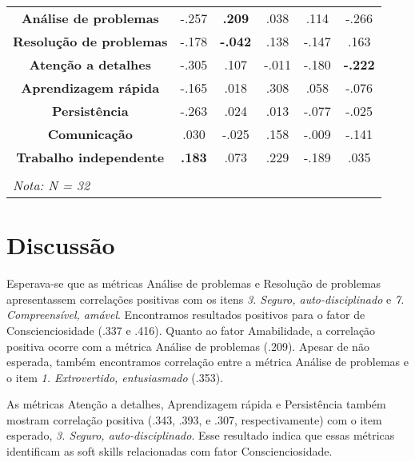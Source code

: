 \begin{sidewaystable}[ph!]
\begin{tabular}{lccccc}
		\midrule
    \multicolumn{1}{c}{\textbf{Análise de problemas}} 		& -.257 				 & \textbf{.209}  & .038  & .114  & -.266 				 \\
    \multicolumn{1}{c}{\textbf{Resolução de problemas}} 	& -.178 				 & \textbf{-.042} & .138  & -.147 & .163 				   \\
    \multicolumn{1}{c}{\textbf{Atenção a detalhes}} 			& -.305 				 & .107 				  & -.011 & -.180 & \textbf{-.222} \\
    \multicolumn{1}{c}{\textbf{Aprendizagem rápida}} 			& -.165 				 & .018 				  & .308  & .058  & -.076  				 \\
    \multicolumn{1}{c}{\textbf{Persistência}} 					  & -.263 				 & .024 				  & .013  & -.077 & -.025 				 \\
    \multicolumn{1}{c}{\textbf{Comunicação}} 							& .030 				   & -.025 				  & .158  & -.009 & -.141 				 \\
    \multicolumn{1}{c}{\textbf{Trabalho independente}} 		& \textbf{.183}  & .073 				  & .229  & -.189 & .035 				   \\
    
		\bottomrule
		\multicolumn{1}{l}{\textbf{}} & & & & &  \\
		\multicolumn{1}{l}{\textit{Nota: N = 32}} & & & & &  \\
		
\end{tabular}
\label{tab:tipiss}
\end{sidewaystable}

\section{Discussão}
\label{sec:discussao}

Esperava-se que as métricas Análise de problemas e Resolução de problemas apresentassem correlações positivas com os itens \textit{3. Seguro, auto-disciplinado} e \textit{7. Compreensível, amável}. Encontramos resultados positivos para o fator de Conscienciosidade (.337 e .416). Quanto ao fator Amabilidade, a correlação positiva ocorre com a métrica Análise de problemas (.209). Apesar de não esperada, também encontramos correlação entre a métrica Análise de problemas e o item \textit{1. Extrovertido, entusiasmado }(.353).

As métricas Atenção a detalhes, Aprendizagem rápida e Persistência também mostram correlação positiva (.343, .393, e .307, respectivamente) com o item esperado, \textit{3. Seguro, auto-disciplinado}. Esse resultado indica que essas métricas identificam as soft skills relacionadas com fator Conscienciosidade.

